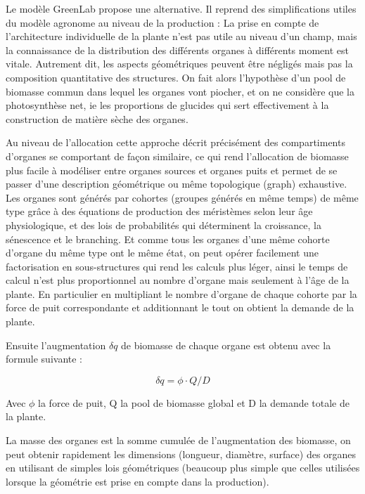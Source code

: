 {\begin{figure}[h]
\begin{center}
  \end{center}
\end{figure}


Le modèle GreenLab propose une alternative. Il reprend des simplifications utiles du modèle agronome au niveau de la production : La prise en compte de l’architecture individuelle de la plante n’est pas utile au niveau d’un champ, mais la connaissance de la distribution des différents organes à différents moment est vitale. Autrement dit, les aspects géométriques peuvent être négligés mais pas la composition quantitative des structures. On fait alors l’hypothèse d’un pool de biomasse commun dans lequel les organes vont piocher, et on ne considère que la photosynthèse net, ie les proportions de glucides qui sert effectivement à la construction de matière sèche des organes. 

Au niveau de l’allocation cette approche décrit précisément des compartiments d’organes se comportant de façon similaire, ce qui rend l’allocation de biomasse plus facile à modéliser entre organes sources et organes puits et permet de se passer d’une description géométrique ou même topologique (graph) exhaustive. Les organes sont générés par cohortes (groupes générés en même temps) de même type grâce à des équations de production des méristèmes selon leur âge physiologique, et des lois de probabilités qui déterminent la croissance, la sénescence et le branching. Et comme tous les organes d’une même cohorte d’organe du même type ont le même état, on peut opérer facilement une factorisation en sous-structures qui rend les calculs plus léger, ainsi le temps de calcul n’est plus proportionnel au nombre d’organe mais seulement à l’âge de la plante. En particulier en multipliant le nombre d’organe de chaque cohorte par la force de puit correspondante et additionnant le tout on obtient la demande de la plante.

Ensuite l’augmentation $\delta q$ de biomasse de chaque organe est obtenu avec la formule suivante :

\[ \delta q = \phi \cdot Q/D \]

Avec $\phi$ la force de puit, Q la pool de biomasse global et D la demande totale de la plante.

La masse des organes est la somme cumulée de l’augmentation des biomasse, on peut obtenir rapidement les dimensions (longueur, diamètre, surface) des organes en utilisant de simples lois géométriques (beaucoup plus simple que celles utilisées lorsque la géométrie est prise en compte dans la production). 

}
